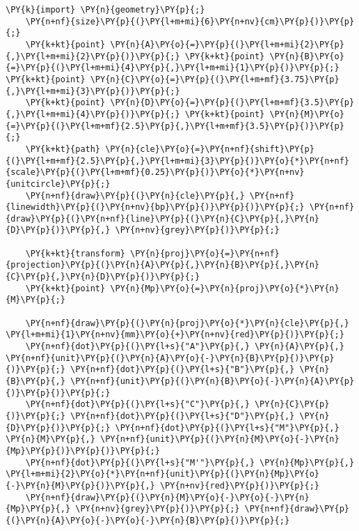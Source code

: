 \begin{Verbatim}[commandchars=\\\{\}]
    \PY{k}{import} \PY{n}{geometry}\PY{p}{;}
    \PY{n+nf}{size}\PY{p}{(}\PY{l+m+mi}{6}\PY{n+nv}{cm}\PY{p}{)}\PY{p}{;}
    \PY{k+kt}{point} \PY{n}{A}\PY{o}{=}\PY{p}{(}\PY{l+m+mi}{2}\PY{p}{,}\PY{l+m+mi}{2}\PY{p}{)}\PY{p}{;} \PY{k+kt}{point} \PY{n}{B}\PY{o}{=}\PY{p}{(}\PY{l+m+mi}{4}\PY{p}{,}\PY{l+m+mi}{1}\PY{p}{)}\PY{p}{;} \PY{k+kt}{point} \PY{n}{C}\PY{o}{=}\PY{p}{(}\PY{l+m+mf}{3.75}\PY{p}{,}\PY{l+m+mi}{3}\PY{p}{)}\PY{p}{;}
    \PY{k+kt}{point} \PY{n}{D}\PY{o}{=}\PY{p}{(}\PY{l+m+mf}{3.5}\PY{p}{,}\PY{l+m+mi}{4}\PY{p}{)}\PY{p}{;} \PY{k+kt}{point} \PY{n}{M}\PY{o}{=}\PY{p}{(}\PY{l+m+mf}{2.5}\PY{p}{,}\PY{l+m+mf}{3.5}\PY{p}{)}\PY{p}{;}
    \PY{k+kt}{path} \PY{n}{cle}\PY{o}{=}\PY{n+nf}{shift}\PY{p}{(}\PY{l+m+mf}{2.5}\PY{p}{,}\PY{l+m+mi}{3}\PY{p}{)}\PY{o}{*}\PY{n+nf}{scale}\PY{p}{(}\PY{l+m+mf}{0.25}\PY{p}{)}\PY{o}{*}\PY{n+nv}{unitcircle}\PY{p}{;}
    \PY{n+nf}{draw}\PY{p}{(}\PY{n}{cle}\PY{p}{,} \PY{n+nf}{linewidth}\PY{p}{(}\PY{n+nv}{bp}\PY{p}{)}\PY{p}{)}\PY{p}{;} \PY{n+nf}{draw}\PY{p}{(}\PY{n+nf}{line}\PY{p}{(}\PY{n}{C}\PY{p}{,}\PY{n}{D}\PY{p}{)}\PY{p}{,} \PY{n+nv}{grey}\PY{p}{)}\PY{p}{;}

    \PY{k+kt}{transform} \PY{n}{proj}\PY{o}{=}\PY{n+nf}{projection}\PY{p}{(}\PY{n}{A}\PY{p}{,}\PY{n}{B}\PY{p}{,}\PY{n}{C}\PY{p}{,}\PY{n}{D}\PY{p}{)}\PY{p}{;}
    \PY{k+kt}{point} \PY{n}{Mp}\PY{o}{=}\PY{n}{proj}\PY{o}{*}\PY{n}{M}\PY{p}{;}

    \PY{n+nf}{draw}\PY{p}{(}\PY{n}{proj}\PY{o}{*}\PY{n}{cle}\PY{p}{,} \PY{l+m+mi}{1}\PY{n+nv}{mm}\PY{o}{+}\PY{n+nv}{red}\PY{p}{)}\PY{p}{;}
    \PY{n+nf}{dot}\PY{p}{(}\PY{l+s}{"A"}\PY{p}{,} \PY{n}{A}\PY{p}{,} \PY{n+nf}{unit}\PY{p}{(}\PY{n}{A}\PY{o}{-}\PY{n}{B}\PY{p}{)}\PY{p}{)}\PY{p}{;} \PY{n+nf}{dot}\PY{p}{(}\PY{l+s}{"B"}\PY{p}{,} \PY{n}{B}\PY{p}{,} \PY{n+nf}{unit}\PY{p}{(}\PY{n}{B}\PY{o}{-}\PY{n}{A}\PY{p}{)}\PY{p}{)}\PY{p}{;}
    \PY{n+nf}{dot}\PY{p}{(}\PY{l+s}{"C"}\PY{p}{,} \PY{n}{C}\PY{p}{)}\PY{p}{;} \PY{n+nf}{dot}\PY{p}{(}\PY{l+s}{"D"}\PY{p}{,} \PY{n}{D}\PY{p}{)}\PY{p}{;} \PY{n+nf}{dot}\PY{p}{(}\PY{l+s}{"M"}\PY{p}{,} \PY{n}{M}\PY{p}{,} \PY{n+nf}{unit}\PY{p}{(}\PY{n}{M}\PY{o}{-}\PY{n}{Mp}\PY{p}{)}\PY{p}{)}\PY{p}{;}
    \PY{n+nf}{dot}\PY{p}{(}\PY{l+s}{"M'"}\PY{p}{,} \PY{n}{Mp}\PY{p}{,} \PY{l+m+mi}{2}\PY{o}{*}\PY{n+nf}{unit}\PY{p}{(}\PY{n}{Mp}\PY{o}{-}\PY{n}{M}\PY{p}{)}\PY{p}{,} \PY{n+nv}{red}\PY{p}{)}\PY{p}{;}
    \PY{n+nf}{draw}\PY{p}{(}\PY{n}{M}\PY{o}{-}\PY{o}{-}\PY{n}{Mp}\PY{p}{,} \PY{n+nv}{grey}\PY{p}{)}\PY{p}{;} \PY{n+nf}{draw}\PY{p}{(}\PY{n}{A}\PY{o}{-}\PY{o}{-}\PY{n}{B}\PY{p}{)}\PY{p}{;}
\end{Verbatim}
